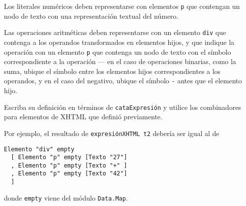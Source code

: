 Los literales numéricos deben representarse con elementos \texttt{p} que
contengan un nodo de texto con una representación textual del número.

Las operaciones aritméticas deben representarse con un elemento
\texttt{div} que contenga a los operandos transformados en elementos
hijos, y que indique la operación con un elemento \texttt{p} que
contenga un nodo de texto con el símbolo correspondiente a la operación
--- en el caso de operaciones binarias, como la suma, ubique el símbolo
entre los elementos hijos correspondientes a los operandos, y en el caso
del negativo, ubique el símbolo \texttt{-} antes que el elemento hijo.

Escriba su definición en términos de \texttt{cataExpresión} y utilice
los combinadores para elementos de XHTML que definió previamente.

\begin{Shaded}
\begin{Highlighting}[]
\OtherTok{->} 
  \FunctionTok{=}  
              \OtherTok{->} 
             \OtherTok{->} \NormalTok{divE [pE }\NormalTok{, expresionXHTML e]}
                 \OtherTok{->} \NormalTok{divE [expresionXHTML e1, pE }\NormalTok{, expresionXHTML e2]}
                \OtherTok{->} \NormalTok{divE [expresionXHTML e1, pE }\NormalTok{, expresionXHTML e2]}
      \OtherTok{->} \NormalTok{divE [expresionXHTML e1, pE }\NormalTok{, expresionXHTML e2]}
      \OtherTok{->} \NormalTok{divE [expresionXHTML e1, pE }\NormalTok{, expresionXHTML e2]}
\end{Highlighting}
\end{Shaded}

Por ejemplo, el resultado de \texttt{expresiónXHTML t2} debería ser
igual al de

\begin{verbatim}
Elemento "div" empty
  [ Elemento "p" empty [Texto "27"]
  , Elemento "p" empty [Texto "+" ]
  , Elemento "p" empty [Texto "42"]
  ]
\end{verbatim}

donde \texttt{empty} viene del módulo \texttt{Data.Map}.

